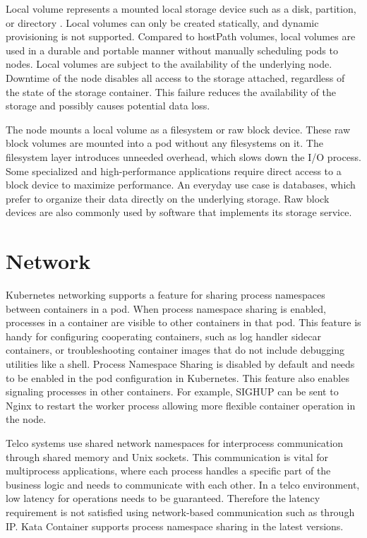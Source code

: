 Local volume represents a mounted local storage device such as a disk, partition, or directory \cite{VolumesKubernetes}. Local volumes can only be created statically, and dynamic provisioning is not supported. Compared to hostPath volumes, local volumes are used in a durable and portable manner without manually scheduling pods to nodes. Local volumes are subject to the availability of the underlying node. Downtime of the node disables all access to the storage attached, regardless of the state of the storage container. This failure reduces the availability of the storage and possibly causes potential data loss.

The node mounts a local volume as a filesystem or raw block device. These raw block volumes are mounted into a pod without any filesystems on it. The filesystem layer introduces unneeded overhead, which slows down the I/O process. Some specialized and high-performance applications require direct access to a block device to maximize performance. An everyday use case is databases, which prefer to organize their data directly on the underlying storage. Raw block devices are also commonly used by software that implements its storage service. \cite{RawBlockKubernetes}

\section{Network}

Kubernetes networking supports a feature for sharing process namespaces between containers in a pod. When process namespace sharing is enabled, processes in a container are visible to other containers in that pod. This feature is handy for configuring cooperating containers, such as log handler sidecar containers, or troubleshooting container images that do not include debugging utilities like a shell. Process Namespace Sharing is disabled by default and needs to be enabled in the pod configuration in Kubernetes. This feature also enables signaling processes in other containers. For example, SIGHUP can be sent to Nginx to restart the worker process allowing more flexible container operation in the node. \cite{ShareProcessNamespaceKubernetes}

Telco systems use shared network namespaces for interprocess communication through shared memory and Unix sockets. This communication is vital for multiprocess applications, where each process handles a specific part of the business logic and needs to communicate with each other. In a telco environment, low latency for operations needs to be guaranteed. Therefore the latency requirement is not satisfied using network-based communication such as through IP. Kata Container supports process namespace sharing in the latest versions.

